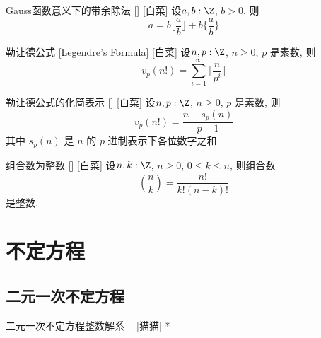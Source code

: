 \documentclass[UTF8]{ctexart}
\begin{document}
            \begin{ppt}
                [DivisionWithRemainderUnderGaussFunction]
                {Gauss函数意义下的带余除法}
                []
                [白菜]
                设\(a, b:\Z\), \(b>0\), 则
                \[a=b\lfloor \frac{a}{b} \rfloor + b\{\frac{a}{b}\}\]
            \end{ppt}

            \begin{thm}
                [LegendreFormula]
                {勒让德公式}
                [Legendre's Formula]
                [白菜]
                设\(n, p:\Z\), \(n\geq 0\), \(p\) 是素数, 则
                \[v_p(n!)=\sum_{i=1}^{\infty}\lfloor\frac{n}{p^i}\rfloor\]
            \end{thm}

            \begin{crl}
                [SimplifiedLegendreFormula]
                {勒让德公式的化简表示}
                []
                [白菜]
                设\(n, p:\Z\), \(n\geq 0\), \(p\) 是素数, 则
                \[v_p(n!)=\frac{n-s_p(n)}{p-1}\]
                其中 \(s_p(n)\) 是 \(n\) 的 \(p\) 进制表示下各位数字之和.
            \end{crl}

            \begin{crl}
                [CombinationIsInteger]
                {组合数为整数}
                []
                [白菜]
                设\(n, k:\Z\), \(n\geq 0\), \(0\leq k\leq n\), 则组合数
                \[\binom{n}{k}=\frac{n!}{k!(n-k)!}\]
                是整数.
            \end{crl}
    \section{不定方程}
        
        \subsection{二元一次不定方程}
        
            \begin{thm}
                []
                {二元一次不定方程整数解系}
                []
                [猫猫]
                \THM
                    [ \(a, b, c, x_0, y_0:\Z\), \(a\neq 0\), \(b\neq 0\), \(ax_0+by_0=c\)]
                    {\[\forall x,y:\Z, ax+by=c\implies\exists k:\Z, 
                    \begin{cases}
                    \begin{aligned}
                        &x=x_0+\frac{b}{\gcd(a,b)}k\\
                        &y=y_0-\frac{a}{\gcd(a,b)}k
                    \end{aligned}
                    \end{cases}\]}*
            \end{thm}
\end{document}
